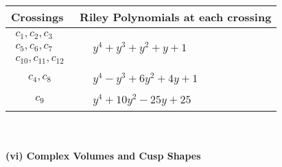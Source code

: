 \documentclass[1p]{elsarticle_modified}
\theoremstyle{definition}
\begin{document}
\begin{tabular}{m{50pt}|m{274pt}}
Crossings & \hspace{64pt}Riley Polynomials at each crossing \\
\hline $$\begin{aligned}c_{1},c_{2},c_{3}\\c_{5},c_{6},c_{7}\\c_{10},c_{11},c_{12}\end{aligned}$$&$\begin{aligned}
&y^4+y^3+y^2+y+1
\end{aligned}$\\
\hline $$\begin{aligned}c_{4},c_{8}\end{aligned}$$&$\begin{aligned}
&y^4- y^3+6 y^2+4 y+1
\end{aligned}$\\
\hline $$\begin{aligned}c_{9}\end{aligned}$$&$\begin{aligned}
&y^4+10 y^2-25 y+25
\end{aligned}$\\
\hline
\end{tabular}\\~\\
\newpage\flushleft \textbf{(vi) Complex Volumes and Cusp Shapes}
\end{document}
